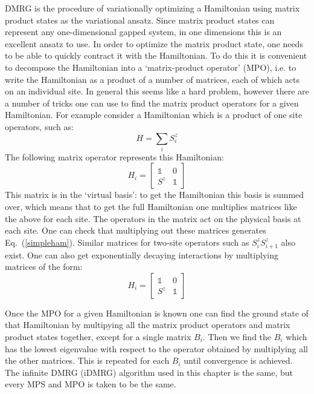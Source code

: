 DMRG is the procedure of variationally optimizing a Hamiltonian using matrix product states as the variational ansatz. Since matrix product states can represent any one-dimensional gapped system, in one dimensions this is an excellent ansatz to use. In order to optimize the matrix product state, one needs to be able to quickly contract it with the Hamiltonian. To do this it is convenient to decompose the Hamiltonian into a `matrix-product operator' (MPO), i.e. to write the Hamiltonian as a product of a number of matrices, each of which acts on an individual site. In general this seems like a hard problem, however there are a number of tricks one can use to find the matrix product operators for a given Hamiltonian. For example consider a Hamiltonian which is a product of one site operators, such as:
\begin{equation}
H=\sum_i S^z_i
\label{simpleham}
\end{equation}
The following matrix operator represents this Hamiltonian:
\begin{equation}
H_i=\left[\begin{array}{cc} \mathbb{1} & 0 \\ S^z & \mathbb{1}\end{array}\right]
\end{equation}
This matrix is in the `virtual basis': to get the Hamiltonian this basis is summed over, which means that to get the full Hamiltonian one multiplies matrices like the above for each site. The operators in the matrix act on the physical basis at each site. One can check that multiplying out these matrices generates Eq.~(\ref{simpleham}). Similar matrices for two-site operators such as $S^z_i S^z_{i+1}$ also exist. One can also get exponentially decaying interactions by multiplying matrices of the form:
\begin{equation}
H_i=\left[\begin{array}{cc} \mathbb{1} & 0 \\ S^z & \mathbb{1}\end{array}\right]
\end{equation}

Once the MPO for a given Hamiltonian is known one can find the ground state of that Hamiltonian by multipying all the matrix product operators and matrix product states together, except for a single matrix $B_i$. Then we find the $B_i$ which has the lowest eigenvalue with respect to the operator obtained by multiplying all the other matrices. This is repeated for each $B_i$ until convergence is achieved. The infinite DMRG (iDMRG) algorithm used in this chapter is the same, but every MPS and MPO is taken to be the same.

